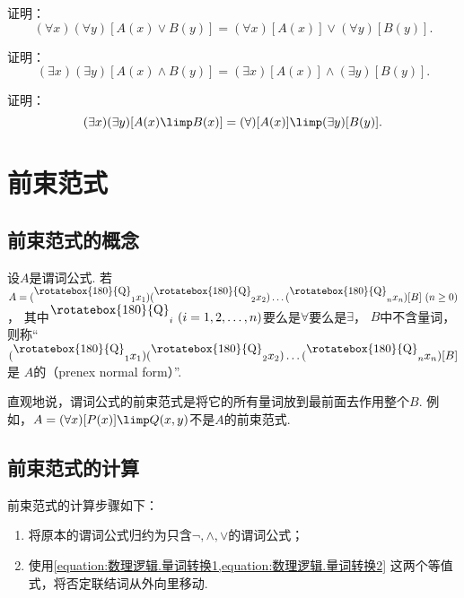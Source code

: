 \begin{example}
证明：\begin{equation}
	(\forall x)(\forall y)[A(x) \lor B(y)]
	= (\forall x)[A(x)] \lor (\forall y)[B(y)].
\end{equation}
\end{example}

\begin{example}
证明：\begin{equation}
	(\exists x)(\exists y)[A(x) \land B(y)]
	= (\exists x)[A(x)] \land (\exists y)[B(y)].
\end{equation}
\end{example}

\begin{example}
证明：\begin{equation}
	(\exists x)(\exists y)[A(x) \limp B(x)]
	= (\forall)[A(x)] \limp (\exists y)[B(y)].
\end{equation}
\end{example}

\section{前束范式}
\subsection{前束范式的概念}
\begin{definition}
设\(A\)是谓词公式.
\def\Q{\raisebox{.6em}{\rotatebox{180}{Q}}}
若\(A = (\Q_1 x_1)(\Q_2 x_2)\dotso(\Q_n x_n)[B]\ (n\geq0)\)，
其中\(\Q_i\ (i=1,2,\dotsc,n)\)要么是\(\forall\)要么是\(\exists\)，
\(B\)中不含量词，
则称“\((\Q_1 x_1)(\Q_2 x_2)\dotso(\Q_n x_n)[B]\)是
\(A\)的（prenex normal form）”.
\end{definition}

直观地说，谓词公式的前束范式是将它的所有量词放到最前面去作用整个\(B\).
例如，\(A = (\forall x)[P(x)] \limp Q(x,y)\)不是\(A\)的前束范式.

\subsection{前束范式的计算}
前束范式的计算步骤如下：\begin{enumerate}
	\item 将原本的谓词公式归约为只含\(\neg,\land,\lor\)的谓词公式；
	\item 使用\cref{equation:数理逻辑.量词转换1,equation:数理逻辑.量词转换2}
	这两个等值式，将否定联结词从外向里移动.
\end{enumerate}

